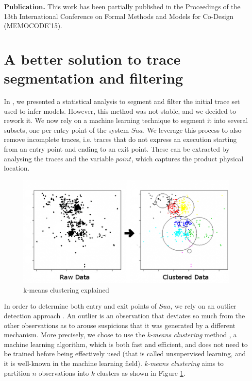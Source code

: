\textbf{Publication.} This work has been partially published in
the Proceedings of the 13th International Conference on Formal
Methods and Models for Co-Design (MEMOCODE'15).


\section{A better solution to trace segmentation and filtering}
\label{sec:testing:segmentation}

In
,
we presented a statistical analysis to segment and filter the
initial trace set used to infer models. However, this method was
not stable, and we decided to rework it. We now rely on a machine
learning technique to segment it into several subsets, one per
entry point of the system $\mathit{Sua}$. We leverage this
process to also remove incomplete traces, i.e. traces that do not
express an execution starting from an entry point and ending to
an exit point. These can be extracted by analysing the traces and
the variable $point$, which captures the product physical
location.

\begin{figure}[ht]
    \includegraphics[width=1.0\linewidth]{figures/kmeans.png}

    \caption{k-means clustering explained}
    \label{fig:kmeans}
\end{figure}

In order to determine both entry and exit points of
$\mathit{Sua}$, we rely on an outlier detection approach
\cite{1695852}. An outlier is an observation that deviates so
much from the other observations as to arouse suspicions that it
was generated by a different mechanism. More precisely, we chose
to use the \textit{k-means clustering} method
\cite{10.2307/2346830}, a machine learning algorithm, which is
both fast and efficient, and does not need to be trained before
being effectively used (that is called unsupervised learning, and
it is well-known in the machine learning field). \textit{k-means
clustering} aims to partition $n$ observations into $k$ clusters
as shown in Figure \ref{fig:kmeans}.

